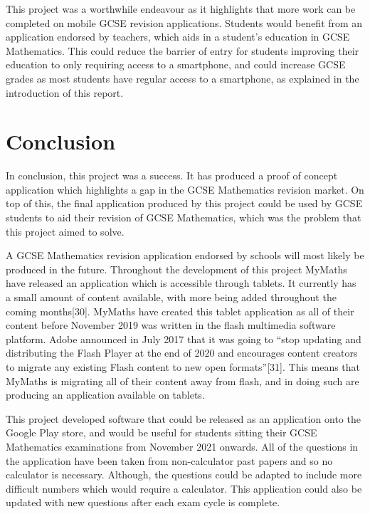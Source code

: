 \documentclass{article}
\begin{document}
This project was a worthwhile endeavour as it highlights that more work can be completed on mobile GCSE revision applications. Students would benefit from an application endorsed by teachers, which aids in a student's education in GCSE Mathematics. This could reduce the barrier of entry for students improving their education to only requiring access to a smartphone, and could increase GCSE grades as most students have regular access to a smartphone, as explained in the introduction of this report. \par

\section{Conclusion}
\label{section:conclusion}

In conclusion, this project was a success. It has produced a proof of concept application which highlights a gap in the GCSE Mathematics revision market. On top of this, the final application produced by this project could be used by GCSE students to aid their revision of GCSE Mathematics, which was the problem that this project aimed to solve. \par

A GCSE Mathematics revision application endorsed by schools will most likely be produced in the future. Throughout the development of this project MyMaths have released an application which is accessible through tablets. It currently has a small amount of content available, with more being added throughout the coming months[30]. MyMaths have created this tablet application as all of their content before November 2019 was written in the flash multimedia software platform. Adobe announced in July 2017 that it was going to ``stop updating and distributing the Flash Player at the end of 2020 and encourages content creators to migrate any existing Flash content to new open formats''[31]. This means that MyMaths is migrating all of their content away from flash, and in doing such are producing an application available on tablets. \par

This project developed software that could be released as an application onto the Google Play store, and would be useful for students sitting their GCSE Mathematics examinations from November 2021 onwards. All of the questions in the application have been taken from non-calculator past papers and so no calculator is necessary. Although, the questions could be adapted to include more difficult numbers which would require a calculator. This application could also be updated with new questions after each exam cycle is complete. \par
\end{document}
